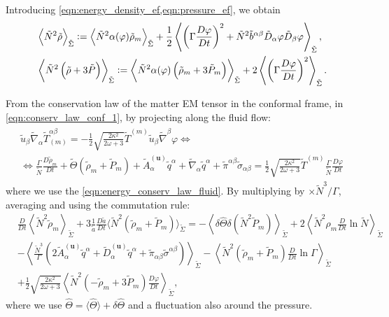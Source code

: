 Introducing \cref{eqn:energy_density_ef,eqn:pressure_ef}, we obtain
\begin{align}
    &\left\langle \Tilde{N}^2\Tilde{\rho}\right\rangle_{\Tilde{\Sigma}} := \left\langle \tilde{N}^2 \alpha(\varphi)\tilde{\rho}_m \right\rangle_{\Tilde{\Sigma}}+\frac{1}{2}\left\langle \left(\Gamma\frac{D\varphi}{Dt}\right)^2+\tilde{N}^2 \tilde{b}^{\alpha\beta}\tilde{D}_\alpha\varphi \tilde{D}_\beta\varphi\right\rangle_{\tilde{\Sigma}}, \\
    &\left\langle \Tilde{N}^2\left(\Tilde{\rho}+3\Tilde{P}\right)\right\rangle_{\Tilde{\Sigma}} := \left\langle \tilde{N}^2 \alpha(\varphi)\left(\tilde{\rho}_m+3\tilde{P}_m\right) \right\rangle_{\Tilde{\Sigma}}+2\left\langle \left(\Gamma\frac{D\varphi}{Dt}\right)^2 \right\rangle_{\tilde{\Sigma}}.
\end{align}

From the conservation law of the matter EM tensor in the conformal frame, in \cref{eqn:conserv_law_conf_1}, by projecting along the fluid flow:
\begin{align}
\begin{gathered}
    \tilde{u}_\beta\tilde{\nabla}_\alpha \tilde{T}_{(m)}^{\alpha\beta}=-\frac{1}{2}\sqrt{\frac{2\kappa^2}{2\omega+3}} \tilde{T}^{(m)} \tilde{u}_\beta\tilde{\nabla}^\beta \varphi \Leftrightarrow\\
    \Leftrightarrow \frac{\Gamma}{\tilde{N}}\frac{D\tilde{\rho}_m}{Dt} + \tilde{\Theta}(\tilde{\rho}_m+\tilde{P}_m) + \tilde{A}^{(\mathbf{u})}_\alpha \tilde{q}^\alpha + \tilde{\nabla}_\alpha \tilde{q}^\alpha +\tilde{\pi}^{\alpha\beta}\tilde{\sigma}_{\alpha\beta}= \frac{1}{2}\sqrt{\frac{2\kappa^2}{2\omega+3}} \tilde{T}^{(m)} \frac{\Gamma}{\tilde{N}}\frac{D\varphi}{Dt}
\end{gathered}
\end{align}
where we use the \cref{eqn:energy_conserv_law_fluid}. By multiplying by $\times \tilde{N}^3/\Gamma$, averaging and using the commutation rule:
\begin{align}
    &\frac{D}{Dt}\left\langle \tilde{N}^2\tilde{\rho}_m\right\rangle_{\tilde{\Sigma}}+3\frac{1}{\tilde{a}}\frac{D\tilde{a}}{Dt}\langle \tilde{N}^2(\tilde{\rho}_m+\tilde{P}_m)\rangle_{\tilde{\Sigma}}=-\left\langle\delta\hat{\Theta}\delta(\tilde{N}^2\tilde{P}_m)\right\rangle_{\tilde{\Sigma}}+2\left\langle \tilde{N}^2\rho_m \frac{D}{Dt}\ln\tilde{N}\right\rangle_{\tilde{\Sigma}}\nonumber\\
    &-\left\langle \frac{\tilde{N}^3}{\Gamma}\left(2\tilde{A}^{(\mathbf{u})}_\alpha \tilde{q}^\alpha+\tilde{D}^{(\mathbf{u})}_\alpha \tilde{q}^\alpha+\tilde{\pi}_{\alpha\beta}\tilde{\sigma}^{\alpha\beta}\right)\right\rangle_{\tilde{\Sigma}}-\left\langle\tilde{N}^2(\tilde{\rho}_m+\tilde{P}_m)\frac{D}{Dt}\ln\Gamma\right\rangle_{\tilde{\Sigma}}\nonumber\\
    &+\frac{1}{2}\sqrt{\frac{2\kappa^2}{2\omega+3}}\left\langle \tilde{N}^2(-\tilde{\rho}_m+3\tilde{P}_m)\frac{D\varphi}{Dt}\right\rangle_{\tilde{\Sigma}},
\end{align}
where we use $\hat{\Theta}=\langle\hat{\Theta}\rangle+\delta\hat{\Theta}$ and a fluctuation also around the pressure.

